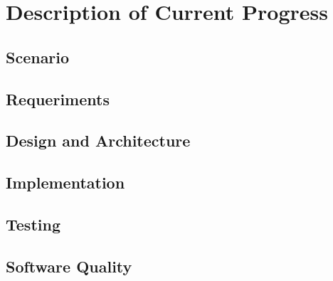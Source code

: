 \chapter{Description of Current Progress}
\label{current-progress}


\section{Scenario}
\section{Requeriments}
\section{Design and Architecture}
\section{Implementation}
\section{Testing}
\section{Software Quality}